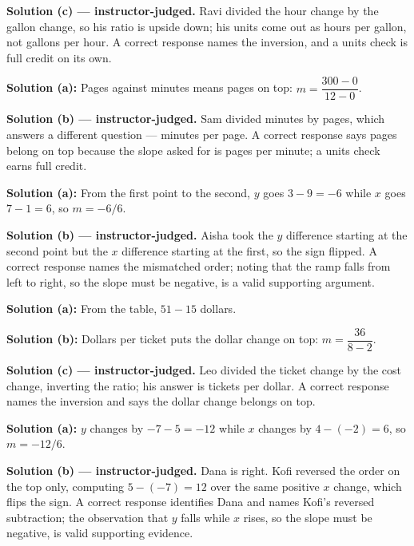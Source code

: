 \documentclass[12pt]{article}
\begin{document}
\textbf{Solution (c) --- instructor-judged.} Ravi divided the hour change by
the gallon change, so his ratio is upside down; his units come out as hours
per gallon, not gallons per hour. A correct response names the inversion, and
a units check is full credit on its own.


\textbf{Solution (a):} Pages against minutes means pages on top:
$m = \dfrac{300 - 0}{12 - 0}$. 

\textbf{Solution (b) --- instructor-judged.} Sam divided minutes by pages,
which answers a different question --- minutes per page. A correct response
says pages belong on top because the slope asked for is pages per minute; a
units check earns full credit.


\textbf{Solution (a):} From the first point to the second, $y$ goes
$3 - 9 = -6$ while $x$ goes $7 - 1 = 6$, so $m = -6/6$. 

\textbf{Solution (b) --- instructor-judged.} Aisha took the $y$ difference
starting at the second point but the $x$ difference starting at the first, so
the sign flipped. A correct response names the mismatched order; noting that
the ramp falls from left to right, so the slope must be negative, is a valid
supporting argument.


\textbf{Solution (a):} From the table, $51 - 15$ dollars. 

\textbf{Solution (b):} Dollars per ticket puts the dollar change on top:
$m = \dfrac{36}{8 - 2}$. 

\textbf{Solution (c) --- instructor-judged.} Leo divided the ticket change by
the cost change, inverting the ratio; his answer is tickets per dollar. A
correct response names the inversion and says the dollar change belongs on
top.


\textbf{Solution (a):} $y$ changes by $-7 - 5 = -12$ while $x$ changes by
$4 - (-2) = 6$, so $m = -12/6$. 

\textbf{Solution (b) --- instructor-judged.} Dana is right. Kofi reversed the
order on the top only, computing $5 - (-7) = 12$ over the same positive $x$
change, which flips the sign. A correct response identifies Dana and names
Kofi's reversed subtraction; the observation that $y$ falls while $x$ rises,
so the slope must be negative, is valid supporting evidence.
\end{document}
